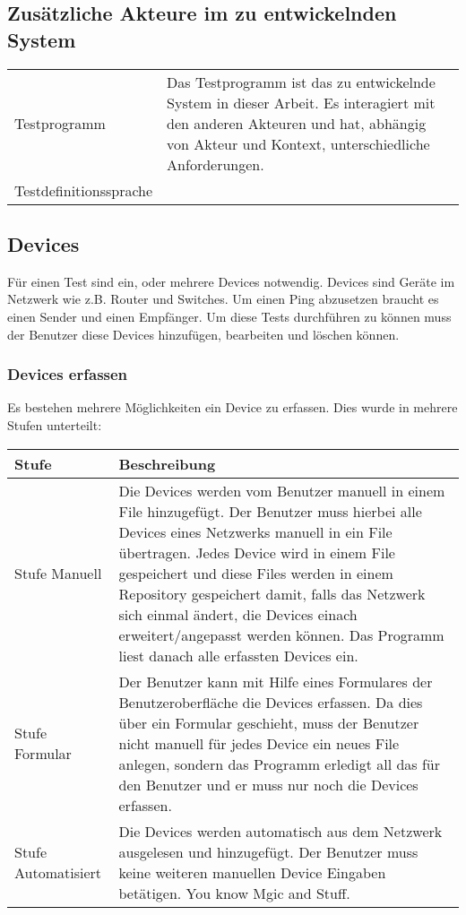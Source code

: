\documentclass[
	ngerman,
	toc=listof, %
	toc=bibliography, %
	footnotes=multiple, %
	parskip=half, %
	numbers=noendperiod %
]{scrartcl}
\begin{document}
	\subsection{Zusätzliche Akteure im zu entwickelnden System}
		\begin{tabularx}{\textwidth}{lX}
			Testprogramm &  Das Testprogramm ist das zu entwickelnde System in dieser Arbeit. Es interagiert mit den anderen Akteuren und hat, abhängig von Akteur und Kontext, unterschiedliche Anforderungen. \\
			Testdefinitionssprache & 
		\end{tabularx}
	
	\subsection{Devices}
		Für einen Test sind ein, oder mehrere Devices notwendig. Devices sind Geräte im Netzwerk wie z.B. Router und Switches.
		Um einen Ping abzusetzen braucht es einen Sender und einen Empfänger.
		Um diese Tests durchführen zu können muss der Benutzer diese Devices hinzufügen, bearbeiten und löschen können. 

		\subsubsection{Devices erfassen}
			Es bestehen mehrere Möglichkeiten ein Device zu erfassen. Dies wurde in mehrere Stufen unterteilt:\\

			\begin{tabularx}{\textwidth}{lX}
				\toprule
				Stufe & Beschreibung\\
				\midrule
				Stufe Manuell & Die Devices werden vom Benutzer manuell in einem File hinzugefügt. Der Benutzer muss hierbei alle Devices eines Netzwerks manuell in ein File übertragen. Jedes Device wird in einem File gespeichert und diese Files werden in einem Repository gespeichert damit, falls das Netzwerk sich einmal ändert, die Devices einach erweitert/angepasst werden können. Das Programm liest danach alle erfassten Devices ein. \\
				\midrule
				Stufe Formular & Der Benutzer kann mit Hilfe eines Formulares der Benutzeroberfläche die Devices erfassen. Da dies über ein Formular geschieht, muss der Benutzer nicht manuell für jedes Device ein neues File anlegen, sondern das Programm erledigt all das für den Benutzer und er muss nur noch die Devices erfassen.\\
				\midrule
				Stufe Automatisiert & Die Devices werden automatisch aus dem Netzwerk ausgelesen und hinzugefügt. Der Benutzer muss keine weiteren manuellen Device Eingaben betätigen. You know Mgic and Stuff. \\
				\bottomrule
			\end{tabularx}
\end{document}
